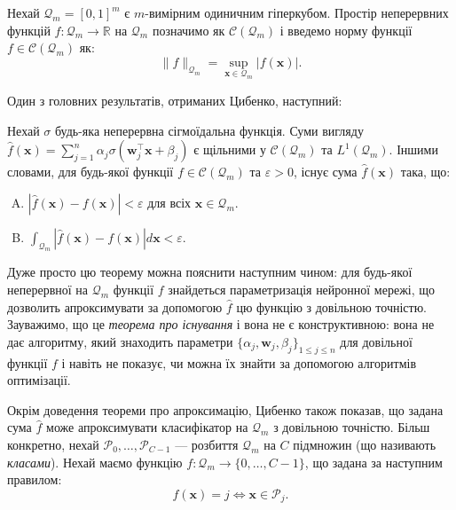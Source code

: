 Нехай $\mathcal{Q}_m = [0,1]^m$ є $m$-вимірним одиничним гіперкубом. Простір
неперервних функцій $f: \mathcal{Q}_m \to \mathbb{R}$ на $\mathcal{Q}_m$
позначимо як $\mathcal{C}(\mathcal{Q}_m)$ і введемо норму функції $f \in
\mathcal{C}(\mathcal{Q}_m)$ як:
\begin{equation*}
    \|f\|_{\mathcal{Q}_m} = \sup_{\mathbf{x} \in \mathcal{Q}_m} |f(\mathbf{x})|.
\end{equation*}

Один з головних результатів, отриманих Цибенко, наступний:
\begin{theorem}\label{theorem:cybenko_1} Нехай $\sigma$ будь-яка неперервна
    сігмоїдальна функція. Суми вигляду $\widehat{f}(\mathbf{x}) = \sum_{j=1}^n
    \alpha_j\sigma(\boldsymbol{w}_j^{\top}\mathbf{x} + \beta_j)$ є щільними у
    $\mathcal{C}(\mathcal{Q}_m)$ та $L^1(\mathcal{Q}_m)$. Іншими словами, для
    будь-якої функції $f \in \mathcal{C}(\mathcal{Q}_m)$ та $\varepsilon > 0$,
    існує сума $\widehat{f}(\mathbf{x})$ така, що:
    \begin{enumerate}[(A)]
        \item $|\widehat{f}(\mathbf{x})-f(\mathbf{x})|<\varepsilon$ для всіх $\mathbf{x} \in
        \mathcal{Q}_m$.
        \item $\int_{\mathcal{Q}_m}|\widehat{f}(\mathbf{x})-f(\mathbf{x})|d\mathbf{x} <
        \varepsilon$.
    \end{enumerate}
\end{theorem}

Дуже просто цю теорему можна пояснити наступним чином: для будь-якої неперервної
на $\mathcal{Q}_m$ функції $f$ знайдеться параметризація нейронної мережі, що
дозволить апроксимувати за допомогою $\widehat{f}$ цю функцію з довільною точністю.
Зауважимо, що це \textit{теорема про існування} і вона не є конструктивною: вона
не дає алгоритму, який знаходить параметри
$\{\alpha_j,\boldsymbol{w}_j,\beta_j\}_{1 \leq j \leq n}$ для довільної функції
$f$ і навіть не показує, чи можна їх знайти за допомогою алгоритмів оптимізації.

Окрім доведення теореми про апроксимацію, Цибенко також показав, що задана сума
$\widehat{f}$ може апроксимувати класифікатор на $\mathcal{Q}_m$ з довільною
точністю. Більш конкретно, нехай $\mathcal{P}_0,\dots,\mathcal{P}_{C-1}$ ---
розбиття $\mathcal{Q}_m$ на $C$ підмножин (що називають \textit{класами}). Нехай
маємо функцію $f: \mathcal{Q}_m \to \{0,\dots,C-1\}$, що задана за наступним
правилом:
\begin{equation*}
    f(\mathbf{x}) = j \iff \mathbf{x} \in \mathcal{P}_j.
\end{equation*}

